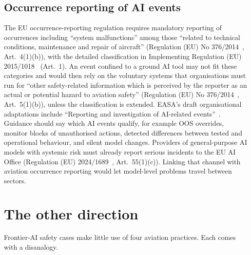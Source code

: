 \documentclass[11pt]{article}
\begin{document}
\subsection{Occurrence reporting of AI events}\label{sec:reporting}

The EU occurrence-reporting regulation requires mandatory reporting of occurrences including ``system malfunctions'' among those ``related to technical conditions, maintenance and repair of aircraft'' (Regulation (EU) No 376/2014~\cite{eu2014occurrence}, Art.~4(1)(b)), with the detailed classification in Implementing Regulation (EU) 2015/1018~\cite{eu2015occurrencelist} (Art.~1). An event confined to a ground AI tool may not fit these categories and would then rely on the voluntary systems that organisations must run for ``other safety-related information which is perceived by the reporter as an actual or potential hazard to aviation safety'' (Regulation (EU) No 376/2014~\cite{eu2014occurrence}, Art.~5(1)(b)), unless the classification is extended. EASA's draft organisational adaptations include ``Reporting and investigation of AI-related events''~\cite[slide~26]{easa2026aidays}. Guidance should say which AI events qualify, for example OOS overrides, monitor blocks of unauthorised actions, detected differences between tested and operational behaviour, and silent model changes. Providers of general-purpose AI models with systemic risk must already report serious incidents to the EU AI Office (Regulation (EU) 2024/1689~\cite{euaiact2024}, Art.~55(1)(c)). Linking that channel with aviation occurrence reporting would let model-level problems travel between sectors.

\section{The other direction}\label{sec:otherdirection}

Frontier-AI safety cases make little use of four aviation practices. Each comes with a disanalogy.
\end{document}
